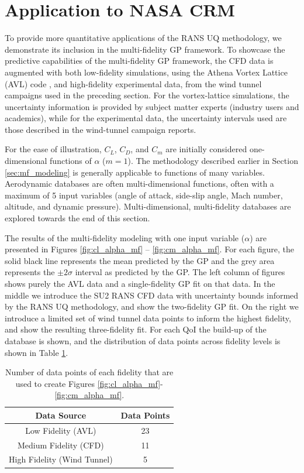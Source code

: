 \section{Application to NASA CRM} \label{sec:mf_gp_nasa_crm}

To provide more quantitative applications of the RANS UQ methodology, we demonstrate its inclusion in the multi-fidelity GP framework. To showcase the predictive capabilities of the multi-fidelity GP framework, the CFD data is augmented with both low-fidelity simulations, using the Athena Vortex Lattice (AVL) code \cite{drela2008athena}, and high-fidelity experimental data, from the wind tunnel campaigns \cite{rivers_further_2012,rivers_experimental_2010} used in the preceding section. For the vortex-lattice simulations, the uncertainty information is provided by subject matter experts (industry users and academics), while for the experimental data, the uncertainty intervals used are those described in the wind-tunnel campaign reports. 

For the ease of illustration, $C_L$, $C_D$, and $C_m$ are initially considered one-dimensional functions of $\alpha$ ($m = 1$). The methodology described earlier in Section \ref{sec:mf_modeling} is generally applicable to functions of many variables. Aerodynamic databases are often multi-dimensional functions, often with a maximum of 5 input variables (angle of attack, side-slip angle, Mach number, altitude, and dynamic pressure). Multi-dimensional, multi-fidelity databases are explored towards the end of this section. 

The results of the multi-fidelity modeling with one input variable ($\alpha$) are presented in Figures \ref{fig:cl_alpha_mf} -- \ref{fig:cm_alpha_mf}. For each figure, the solid black line represents the mean predicted by the GP and the grey area represents the $\pm 2\sigma$ interval as predicted by the GP. The left column of figures shows purely the AVL data and a single-fidelity GP fit on that data. In the middle we introduce the SU2 RANS CFD data with uncertainty bounds informed by the RANS UQ methodology, and show the two-fidelity GP fit. On the right we introduce a limited set of wind tunnel data points to inform the highest fidelity, and show the resulting three-fidelity fit. For each QoI the build-up of the database is shown, and the distribution of data points across fidelity levels is shown in Table \ref{table:data_points}.

\begin{table}
\centering
    \captionsetup{justification=centering}
    \caption{Number of data points of each fidelity that are used to create Figures \ref{fig:cl_alpha_mf}-\ref{fig:cm_alpha_mf}.} 
    \begin{tabular}{|c|c|}
        \hline
        Data Source & Data Points \\ \hline \hline
        Low Fidelity (AVL) & 23 \\ \hline
        Medium Fidelity (CFD) & 11 \\ \hline 
        High Fidelity (Wind Tunnel) & 5 \\ \hline 
    \end{tabular}
    \label{table:data_points}
\end{table}

